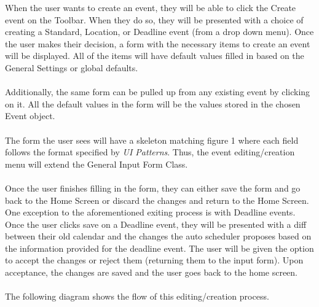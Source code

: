 \documentclass{scrreprt}
\begin{document}
When the user wants to create an event, they will be able to click the Create event on the Toolbar.  When they do so, they will be presented with a choice of creating a Standard, Location, or Deadline event (from a drop down menu). Once the user makes their decision, a form with the necessary items to create an event will be displayed.  All of the items will have default values filled in based on the General Settings or global defaults.
\\\\
Additionally, the same form can be pulled up from any existing event by clicking on  it.  All the default values in the form will be the values stored in the chosen Event object.
\\\\
The form the user sees will have a skeleton matching figure 1 where each field follows the format specified by \textit{UI Patterns}.  Thus, the event editing/creation menu will extend the General Input Form Class.
\\\\
Once the user finishes filling in the form, they can either save the form and go back to the Home Screen or discard the changes and return to the Home Screen.
\\
One exception to the aforementioned exiting process is with Deadline events.  Once the user clicks save on a Deadline event, they will be presented with a diff between their old calendar and the changes the auto scheduler proposes based on the information provided for the deadline event.  The user will be given the option to accept the changes or reject them (returning them to the input form).  Upon acceptance, the changes are saved and the user goes back to the home screen.
\\\\
The following diagram shows the flow of this editing/creation process.
\\\\
\end{document}
